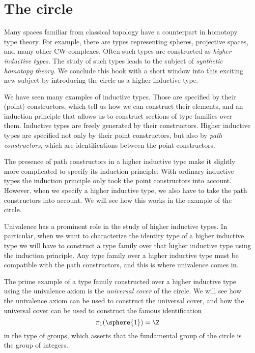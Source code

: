 \chapter{The circle}\label{chapter-synthetic-homotopy-theory}

Many spaces familiar from classical topology have a counterpart in homotopy type theory. For example, there are types representing spheres, projective spaces, and many other CW-complexes. Often such types are constructed as \emph{higher inductive types}. The study of such types leads to the subject of \emph{synthetic homotopy theory}. We conclude this book with a short window into this exciting new subject by introducing the circle as a higher inductive type.

We have seen many examples of inductive types. Those are specified by their (point) constructors, which tell us how we can construct their elements, and an induction principle that allows us to construct sections of type families over them. Inductive types are freely generated by their constructors. Higher inductive types are specified not only by their point constructors, but also by \emph{path constructors}, which are identifications between the point constructors.

The presence of path constructors in a higher inductive type make it slightly more complicated to specify its induction principle. With ordinary inductive types the induction principle only took the point constructors into account. However, when we specify a higher inductive type, we also have to take the path constructors into account. We will see how this works in the example of the circle.

Univalence has a prominent role in the study of higher inductive types. In particular, when we want to characterize the identity type of a higher inductive type we will have to construct a type family over that higher inductive type using the induction principle. Any type family over a higher inductive type must be compatible with the path constructors, and this is where univalence comes in.

The prime example of a type family constructed over a higher inductive type using the univalence axiom is the \emph{universal cover} of the circle. We will see how the univalence axiom can be used to construct the universal cover, and how the universal cover can be used to construct the famous identification
\begin{equation*}
  \pi_1(\sphere{1})=\Z
\end{equation*}
in the type of groups, which asserts that the fundamental group of the circle is the group of integers.




